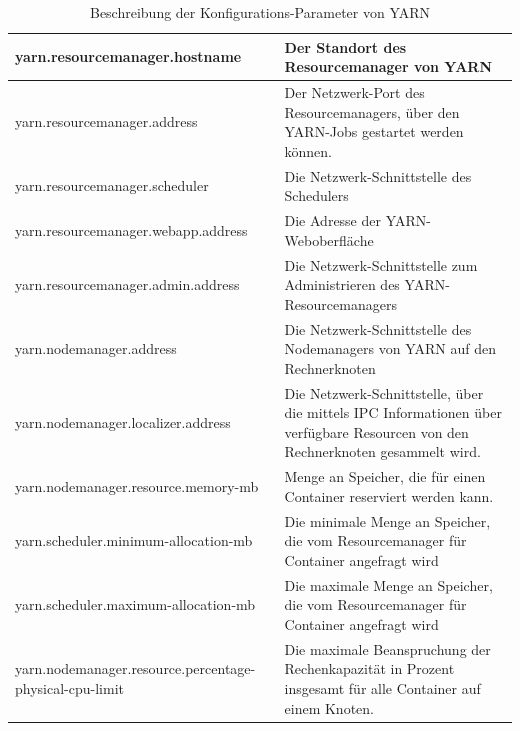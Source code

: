 \begin{table}
	\begin{tabularx}{\textwidth}{| X | X |} \hline
	yarn.resourcemanager.hostname & Der Standort des Resourcemanager von YARN \\ \hline
	yarn.resourcemanager.address &  Der Netzwerk-Port des Resourcemanagers, über den YARN-Jobs gestartet werden können.\\ \hline
	yarn.resourcemanager.scheduler & Die Netzwerk-Schnittstelle des Schedulers\\ \hline
	yarn.resourcemanager.webapp.address & Die Adresse der YARN-Weboberfläche\\ \hline
	yarn.resourcemanager.admin.address & Die Netzwerk-Schnittstelle zum Administrieren des YARN-Resourcemanagers\\ \hline
	yarn.nodemanager.address & Die Netzwerk-Schnittstelle des Nodemanagers von YARN auf den Rechnerknoten\\ \hline
	yarn.nodemanager.localizer.address & Die Netzwerk-Schnittstelle, über die mittels IPC
	Informationen über verfügbare Resourcen von den Rechnerknoten gesammelt wird.\\ \hline
	yarn.nodemanager.resource.memory-mb &  Menge an Speicher, die für einen Container reserviert werden kann.\\ \hline
	yarn.scheduler.minimum-allocation-mb &  Die minimale Menge an Speicher, die vom Resourcemanager für Container angefragt wird\\ \hline
	yarn.scheduler.maximum-allocation-mb &  Die maximale Menge an Speicher, die vom Resourcemanager für Container angefragt wird\\ \hline
	yarn.nodemanager.resource.percentage-physical-cpu-limit & Die maximale Beanspruchung der Rechenkapazität in Prozent insgesamt für alle Container auf einem Knoten. \\ \hline
	\end{tabularx}
	\caption{Beschreibung der Konfigurations-Parameter von YARN}
	\label{config:yarnDescription}
\end{table}


